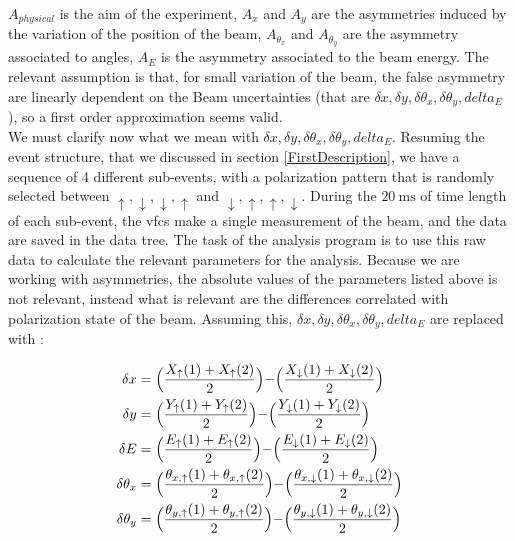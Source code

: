 $A_{physical}$ is the aim of the experiment, $A_{x}$ and $A_{y}$ are the asymmetries induced by the variation of the position of the beam, $A_{\theta_{x}}$ and $A_{\theta_{y}}$ are the asymmetry associated to angles, $A_{E}$ is the asymmetry associated to the beam energy. 
The relevant assumption is that, for small variation of the beam, the false asymmetry are linearly dependent on the Beam uncertainties (that are $\delta x, \delta y, \delta \theta_{x}, \delta \theta_{y}, delta_{E}$), so a first order approximation seems valid.\\
We must clarify now what we mean with $\delta x, \delta y, \delta \theta_{x}, \delta \theta_{y}, delta_{E}$. Resuming the event structure, that we discussed in section \ref{FirstDescription}, we have a sequence of 4 different sub-events, with a polarization pattern that is randomly selected between $\uparrow,\downarrow,\downarrow, \uparrow$ and $\downarrow,\uparrow,\uparrow,\downarrow$. During the $\SI{20}{\milli \second}$ of time length of each sub-event, the vfcs make a single measurement of the beam, and the data are saved in the data tree. The task of the analysis program is to use this raw data to calculate the relevant parameters for the analysis. Because we are working with asymmetries, the absolute values of the parameters listed above is not relevant, instead what is relevant are the differences correlated with polarization state of the beam. Assuming this, $\delta x, \delta y, \delta \theta_{x}, \delta \theta_{y}, delta_{E}$ are replaced with :

\begin{equation}
\begin{split}
\delta {x} & = \Bigl(\dfrac{X_{\uparrow}(1) + X_{\uparrow}(2)}{2}\Bigl)  - \Bigl(\dfrac{X_{\downarrow}(1) + X_{\downarrow}(2)}{2}\Bigl)\\
\delta {y} & = \Bigl(\dfrac{Y_{\uparrow}(1) + Y_{\uparrow}(2)}{2}\Bigl)  - \Bigl(\dfrac{Y_{\downarrow}(1) + Y_{\downarrow}(2)}{2}\Bigl)\\
\delta {E} & = \Bigl(\dfrac{E_{\uparrow}(1) + E_{\uparrow}(2)}{2}\Bigl)  - \Bigl(\dfrac{E_{\downarrow}(1) + E_{\downarrow}(2)}{2}\Bigl)\\
\delta {\theta_{x}} & = \Bigl( \dfrac{\theta_{x,\uparrow}(1) + \theta_{x,\uparrow}(2)}{2} \Bigl) - \Bigl(\dfrac{\theta_{x,\downarrow}(1) + \theta_{x,\downarrow}(2)}{2} \Bigl)\\
\delta {\theta_{y}} & = \Bigl( \dfrac{\theta_{y,\uparrow}(1) + \theta_{y,\uparrow}(2)}{2} \Bigl) - \Bigl(\dfrac{\theta_{y,\downarrow}(1) + \theta_{y,\downarrow}(2)}{2} \Bigl)\\ 
\end{split}
\end{equation}

